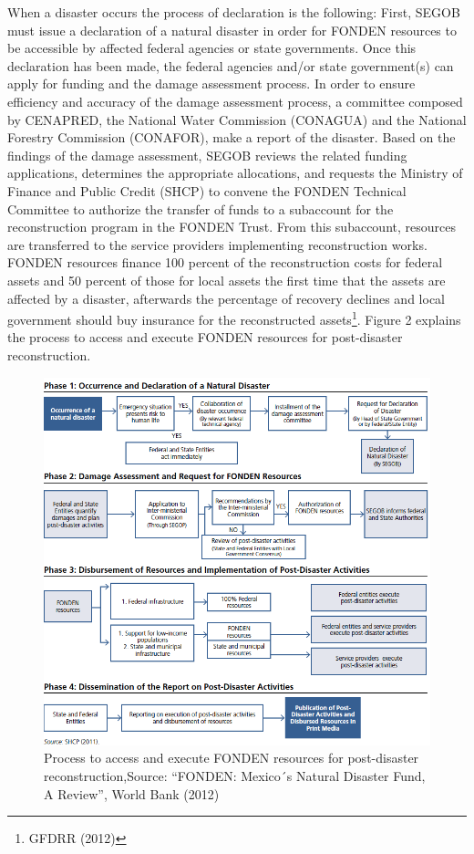 \documentclass[]{article}
\let\rmarkdownfootnote\footnote%
\def\footnote{\protect\rmarkdownfootnote}
\begin{document}
When a disaster occurs the process of declaration is the following:
First, SEGOB must issue a declaration of a natural disaster in order for
FONDEN resources to be accessible by affected federal agencies or state
governments. Once this declaration has been made, the federal agencies
and/or state government(s) can apply for funding and the damage
assessment process. In order to ensure efficiency and accuracy of the
damage assessment process, a committee composed by CENAPRED, the
National Water Commission (CONAGUA) and the National Forestry Commission
(CONAFOR), make a report of the disaster. Based on the findings of the
damage assessment, SEGOB reviews the related funding applications,
determines the appropriate allocations, and requests the Ministry of
Finance and Public Credit (SHCP) to convene the FONDEN Technical
Committee to authorize the transfer of funds to a subaccount for the
reconstruction program in the FONDEN Trust. From this subaccount,
resources are transferred to the service providers implementing
reconstruction works. FONDEN resources finance 100 percent of the
reconstruction costs for federal assets and 50 percent of those for
local assets the first time that the assets are affected by a disaster,
afterwards the percentage of recovery declines and local government
should buy insurance for the reconstructed
assets\footnote{GFDRR (2012)}. Figure 2 explains the process to access
and execute FONDEN resources for post-disaster reconstruction.

\begin{figure}[htbp]
\centering
\includegraphics{img/proces.png}
\caption{Process to access and execute FONDEN resources for
post-disaster reconstruction,\break Source: ``FONDEN: Mexico´s Natural
Disaster Fund, A Review'', World Bank (2012)}
\end{figure}
\end{document}
